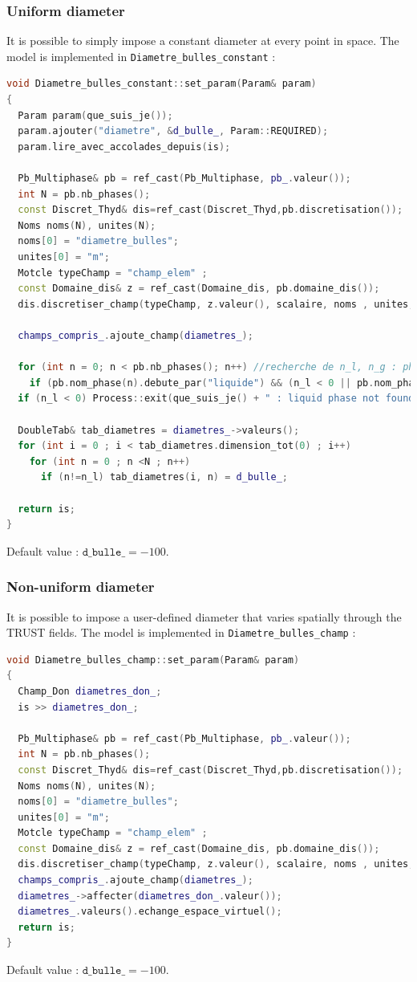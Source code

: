 \subsubsection{Uniform diameter}\mbox{}
It is possible to simply impose a constant diameter at every point in space. The model is implemented in \texttt{Diametre_bulles_constant} :
\begin{lstlisting}[language=c++]
void Diametre_bulles_constant::set_param(Param& param)
{
  Param param(que_suis_je());
  param.ajouter("diametre", &d_bulle_, Param::REQUIRED);
  param.lire_avec_accolades_depuis(is);

  Pb_Multiphase& pb = ref_cast(Pb_Multiphase, pb_.valeur());
  int N = pb.nb_phases();
  const Discret_Thyd& dis=ref_cast(Discret_Thyd,pb.discretisation());
  Noms noms(N), unites(N);
  noms[0] = "diametre_bulles";
  unites[0] = "m";
  Motcle typeChamp = "champ_elem" ;
  const Domaine_dis& z = ref_cast(Domaine_dis, pb.domaine_dis());
  dis.discretiser_champ(typeChamp, z.valeur(), scalaire, noms , unites, N, 0, diametres_);

  champs_compris_.ajoute_champ(diametres_);

  for (int n = 0; n < pb.nb_phases(); n++) //recherche de n_l, n_g : phase {liquide,gaz}_continu en priorite
    if (pb.nom_phase(n).debute_par("liquide") && (n_l < 0 || pb.nom_phase(n).finit_par("continu")))  n_l = n;
  if (n_l < 0) Process::exit(que_suis_je() + " : liquid phase not found!");

  DoubleTab& tab_diametres = diametres_->valeurs();
  for (int i = 0 ; i < tab_diametres.dimension_tot(0) ; i++)
    for (int n = 0 ; n <N ; n++)
      if (n!=n_l) tab_diametres(i, n) = d_bulle_;

  return is;
}
\end{lstlisting}
Default value : $\texttt{d\_ bulle\_} =-100$.

%
\subsubsection{Non-uniform diameter}
It is possible to impose a user-defined diameter that varies spatially through the TRUST fields. The model is implemented in \texttt{Diametre_bulles_champ} :
\begin{lstlisting}[language=c++]
void Diametre_bulles_champ::set_param(Param& param)
{
  Champ_Don diametres_don_;
  is >> diametres_don_;

  Pb_Multiphase& pb = ref_cast(Pb_Multiphase, pb_.valeur());
  int N = pb.nb_phases();
  const Discret_Thyd& dis=ref_cast(Discret_Thyd,pb.discretisation());
  Noms noms(N), unites(N);
  noms[0] = "diametre_bulles";
  unites[0] = "m";
  Motcle typeChamp = "champ_elem" ;
  const Domaine_dis& z = ref_cast(Domaine_dis, pb.domaine_dis());
  dis.discretiser_champ(typeChamp, z.valeur(), scalaire, noms , unites, N, 0, diametres_);
  champs_compris_.ajoute_champ(diametres_);
  diametres_->affecter(diametres_don_.valeur());
  diametres_.valeurs().echange_espace_virtuel();
  return is;
}
\end{lstlisting}
Default value : $\texttt{d\_ bulle\_ }=-100$.

